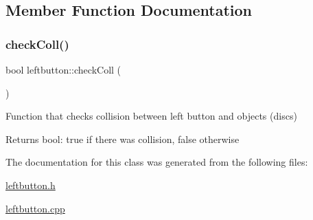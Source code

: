 \subsection{Member Function Documentation}
\mbox{\label{classleftbutton_a33d7fbc6aff28b0233286d3c99c79e83}} 
\subsubsection{\texorpdfstring{check\+Coll()}{checkColl()}}
{\footnotesize\ttfamily bool leftbutton\+::check\+Coll (\begin{DoxyParamCaption}{ }\end{DoxyParamCaption})}



Function that checks collision between left button and objects (discs) 

\begin{DoxyReturn}{Returns}
bool\+: true if there was collision, false otherwise 
\end{DoxyReturn}


The documentation for this class was generated from the following files\+:\begin{DoxyCompactItemize}
\item 
\hyperlink{leftbutton_8h}{leftbutton.\+h}\item 
\hyperlink{leftbutton_8cpp}{leftbutton.\+cpp}\end{DoxyCompactItemize}

